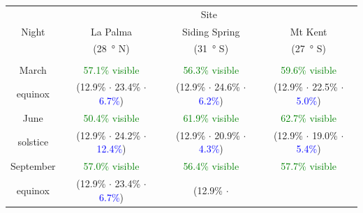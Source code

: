 \begin{colsection}
\begin{colsection}
\begin{table}[t]
\begin{center}
\begin{tabular}{c|ccc} %

\multirow{3}{*}{Night} & \multicolumn{3}{c}{Site} \\
          & La Palma             & Siding Spring  & Mt Kent \\
          & (\SI{28}{\degree} N) &  (\SI{31}{\degree} S) &  (\SI{27}{\degree} S) \\
          \midrule
          \\
March     & \textcolor{Green}{57.1\% visible}
          & \textcolor{Green}{56.3\% visible}
          & \textcolor{Green}{59.6\% visible}
          \\
equinox   & {\scriptsize(\textcolor{BurntOrange}{12.9\%} $\cdot$
                         \textcolor{NavyBlue}{23.4\%} $\cdot$
                         \textcolor{Blue}{6.7\%})}
          & {\scriptsize(\textcolor{BurntOrange}{12.9\%} $\cdot$
                         \textcolor{NavyBlue}{24.6\%} $\cdot$
                         \textcolor{Blue}{6.2\%})}
          & {\scriptsize(\textcolor{BurntOrange}{12.9\%} $\cdot$
                         \textcolor{NavyBlue}{22.5\%} $\cdot$
                         \textcolor{Blue}{5.0\%})}
          \\[0.5cm]
June      & \textcolor{Green}{50.4\% visible}
          & \textcolor{Green}{61.9\% visible}
          & \textcolor{Green}{62.7\% visible}
          \\
solstice  & {\scriptsize(\textcolor{BurntOrange}{12.9\%} $\cdot$
                         \textcolor{NavyBlue}{24.2\%} $\cdot$
                         \textcolor{Blue}{12.4\%})}
          & {\scriptsize(\textcolor{BurntOrange}{12.9\%} $\cdot$
                         \textcolor{NavyBlue}{20.9\%} $\cdot$
                         \textcolor{Blue}{4.3\%})}
          & {\scriptsize(\textcolor{BurntOrange}{12.9\%} $\cdot$
                         \textcolor{NavyBlue}{19.0\%} $\cdot$
                         \textcolor{Blue}{5.4\%})}
          \\[0.5cm]
September & \textcolor{Green}{57.0\% visible}
          & \textcolor{Green}{56.4\% visible}
          & \textcolor{Green}{57.7\% visible}
          \\
equinox   & {\scriptsize(\textcolor{BurntOrange}{12.9\%} $\cdot$
                         \textcolor{NavyBlue}{23.4\%} $\cdot$
                         \textcolor{Blue}{6.7\%})}
          & {\scriptsize(\textcolor{BurntOrange}{12.9\%} $\cdot$
}
\end{tabular}
\end{center}
\end{table}
\end{colsection}
\end{colsection}
